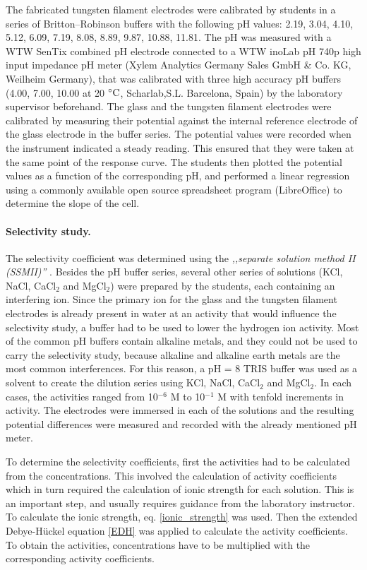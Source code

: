 \documentclass[manuscript=article, journal=jceda8]{achemso}
\begin{document}
The fabricated tungsten filament electrodes were calibrated by students in a series of Britton--Robinson buffers with the following pH values: 2.19, 3.04, 4.10, 5.12, 6.09, 7.19, 8.08, 8.89, 9.87, 10.88, 11.81. The pH was measured with a WTW SenTix combined pH electrode connected to a WTW inoLab pH 740p high input impedance pH meter (Xylem Analytics Germany Sales GmbH \& Co. KG, Weilheim Germany), that was calibrated with three high accuracy pH buffers (4.00, 7.00, 10.00 at 20 $\celsius$, Scharlab,S.L. Barcelona, Spain) by the laboratory supervisor beforehand. The glass and the tungsten filament electrodes were calibrated by measuring their potential against the internal reference electrode of the glass electrode in the buffer series. The potential values were recorded when the instrument indicated a steady reading. This ensured that they were taken at the same point of the response curve. The students then plotted the potential values as a function of the corresponding pH, and performed a linear regression using a commonly available open source spreadsheet program (LibreOffice) to determine the slope of the cell. 


\paragraph{Selectivity study.}

The selectivity coefficient was determined using the \emph{,,separate solution method II (SSMII)''} \cite{buck1994recommendations}. Besides the pH buffer series, several other series of solutions (KCl, NaCl, CaCl$_2$ and MgCl$_2$) were prepared by the students, each containing an interfering ion. Since the primary ion for the glass and the tungsten filament electrodes is already present in water at an activity that would influence the selectivity study, a buffer had to be used to lower the hydrogen ion activity. Most of the common pH buffers contain alkaline metals, and they could not be used to carry the selectivity study, because alkaline and alkaline earth metals are the most common interferences. For this reason, a pH = 8 TRIS buffer was used as a solvent to create the dilution series using KCl, NaCl, CaCl$_2$ and MgCl$_2$. In each cases, the activities ranged from 10$^{-6}$ M to 10$^{-1}$ M with tenfold increments in activity. The electrodes were immersed in each of the solutions and the resulting potential differences were measured and recorded with the already mentioned pH meter. 

To determine the selectivity coefficients, first the activities had to be calculated from the concentrations. This involved the calculation of activity coefficients which in turn required the calculation of ionic strength for each solution. This is an important step, and usually requires guidance from the laboratory instructor. To calculate the ionic strength, eq. \ref{ionic_strength} was used. Then the extended Debye-Hückel equation \ref{EDH} was applied to calculate the activity coefficients. To obtain the activities, concentrations have to be multiplied with the corresponding activity coefficients.
\end{document}
